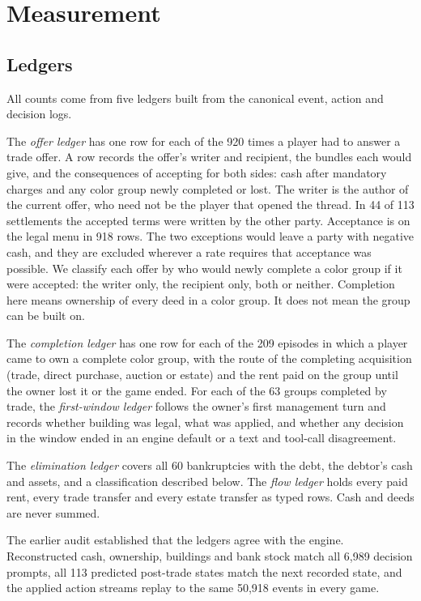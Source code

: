 \section{Measurement}
\label{sec:measurement}

\subsection{Ledgers}

All counts come from five ledgers built from the canonical event, action and decision logs.

The \emph{offer ledger} has one row for each of the 920 times a player had to answer a trade offer. A row records the offer's writer and recipient, the bundles each would give, and the consequences of accepting for both sides: cash after mandatory charges and any color group newly completed or lost. The writer is the author of the current offer, who need not be the player that opened the thread. In 44 of 113 settlements the accepted terms were written by the other party. Acceptance is on the legal menu in 918 rows. The two exceptions would leave a party with negative cash, and they are excluded wherever a rate requires that acceptance was possible. We classify each offer by who would newly complete a color group if it were accepted: the writer only, the recipient only, both or neither. Completion here means ownership of every deed in a color group. It does not mean the group can be built on.

The \emph{completion ledger} has one row for each of the 209 episodes in which a player came to own a complete color group, with the route of the completing acquisition (trade, direct purchase, auction or estate) and the rent paid on the group until the owner lost it or the game ended. For each of the 63 groups completed by trade, the \emph{first-window ledger} follows the owner's first management turn and records whether building was legal, what was applied, and whether any decision in the window ended in an engine default or a text and tool-call disagreement.

The \emph{elimination ledger} covers all 60 bankruptcies with the debt, the debtor's cash and assets, and a classification described below. The \emph{flow ledger} holds every paid rent, every trade transfer and every estate transfer as typed rows. Cash and deeds are never summed.

The earlier audit established that the ledgers agree with the engine. Reconstructed cash, ownership, buildings and bank stock match all 6,989 decision prompts, all 113 predicted post-trade states match the next recorded state, and the applied action streams replay to the same 50,918 events in every game.

